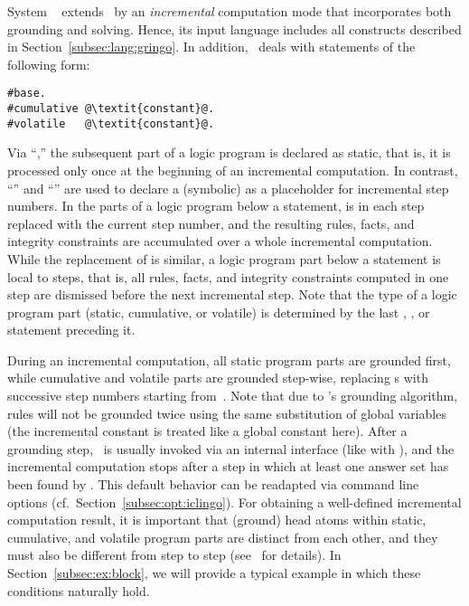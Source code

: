 System \iclingo~\cite{gekakaosscth08a} extends \clingo\ by an
\emph{incremental} computation mode that incorporates both grounding and solving.
Hence, its input language includes all constructs described
in Section~\ref{subsec:lang:gringo}.
In addition, \iclingo\ deals with statements of the following form:
%
\begin{lstlisting}[numbers=none,escapechar=@]
#base.
#cumulative @\textit{constant}@.
#volatile   @\textit{constant}@.
\end{lstlisting}
%
Via ``,''
the subsequent part of a logic program is declared as static, that is,
it is processed only once at the beginning of an incremental computation.
In contrast, ``''
and ``'' are used to declare
a (symbolic)  as a placeholder for incremental step numbers.
In the parts of a logic program below a  statement,
 is in each step replaced with the current step number,
and the resulting rules, facts, and integrity constraints are accumulated
over a whole incremental computation.
While the replacement of  is similar,
a logic program part below a  statement is local to steps,
that is, all rules, facts, and integrity constraints computed in one step
are dismissed before the next incremental step.
Note that the type of a logic program part (static, cumulative, or volatile)
is determined by the last
, , or  statement
preceding it.

During an incremental computation, all static program parts are grounded first,
while cumulative and volatile parts are grounded step-wise,
replacing s with successive step numbers starting from~.
Note that due to \gringo's grounding algorithm,
rules will not be grounded twice using the same substitution of global variables
(the incremental constant is treated like a global constant here).
After a grounding step, \clasp\ is usually invoked via an internal interface
(like with \clingo), and the incremental computation stops after a step
in which at least one answer set has been found by \clasp.
This default behavior can be readapted via command line 
options (cf.\ Section~\ref{subsec:opt:iclingo}).
For obtaining a well-defined incremental computation result,
it is important that (ground) head atoms within static, cumulative, and volatile program parts
are distinct from each other, and they must also be different from step to step
(see~\cite{gekakaosscth08a} for details).
In Section~\ref{subsec:ex:block},
we will provide a typical example in which these conditions naturally hold.

